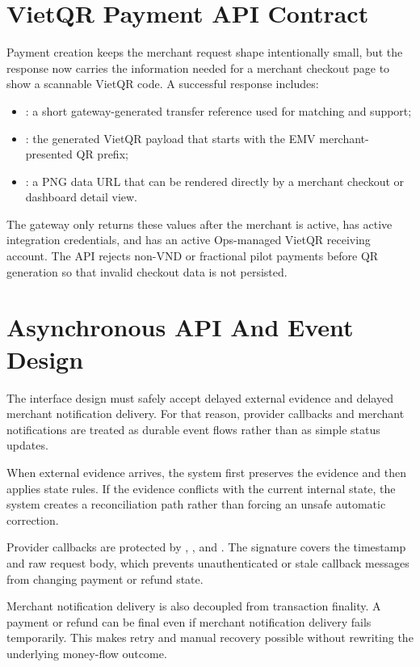 \section{VietQR Payment API Contract}

Payment creation keeps the merchant request shape intentionally small, but the
response now carries the information needed for a merchant checkout page to show
a scannable VietQR code. A successful response includes:

\begin{itemize}
  \item {}: a short gateway-generated transfer reference used
  for matching and support;
  \item {}: the generated VietQR payload that starts with the
  EMV merchant-presented QR prefix;
  \item {}: a PNG data URL that can be rendered directly by
  a merchant checkout or dashboard detail view.
\end{itemize}

The gateway only returns these values after the merchant is active, has active
integration credentials, and has an active Ops-managed VietQR receiving account.
The API rejects non-VND or fractional pilot payments before QR generation so
that invalid checkout data is not persisted.

\section{Asynchronous API And Event Design}

The interface design must safely accept delayed external evidence and delayed
merchant notification delivery. For that reason, provider callbacks and
merchant notifications are treated as durable event flows rather than as simple
status updates.

When external evidence arrives, the system first preserves the evidence and then
applies state rules. If the evidence conflicts with the current internal state,
the system creates a reconciliation path rather than forcing an unsafe
automatic correction.

Provider callbacks are protected by ,
, and . The signature
covers the timestamp and raw request body, which prevents unauthenticated or
stale callback messages from changing payment or refund state.

Merchant notification delivery is also decoupled from transaction finality. A
payment or refund can be final even if merchant notification delivery fails
temporarily. This makes retry and manual recovery possible without rewriting the
underlying money-flow outcome.

